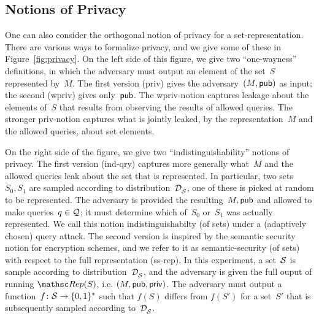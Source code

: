\subsection{Notions of Privacy}
One can also consider the orthogonal notion of privacy for a
set-representation.   There are various ways to formalize privacy, and
we give some of these in Figure~\ref{fig:privacy}.  
On the left side of this figure, we give two ``one-wayness''
definitions, in which the adversary must output an element of the
set~$S$ represented by~$M$.  The first version (priv) gives the
adversary~$(M,{\sf pub})$ as input; the second (wpriv) gives
only~${\sf pub}$.  The wpriv-notion captures leakage about the elements
of~$S$ that results from observing the results of allowed queries.
The stronger priv-notion captures what is jointly leaked, by the
representation~$M$ and the allowed queries, about set elements.

On the right side of the figure, we give two ``indistinguishability''
notions of privacy.  The first version (ind-qry) captures more
generally what~$M$ and the allowed queries leak about the set that is
represented.  In particular, two sets~$S_0,S_1$ are sampled according
to distribution~$\mathcal{D}_{{\cal S}}^{}$, one of these is picked at random to
be represented.  The adversary is provided the resulting~$M,{\sf pub}$
and allowed to make queries~$q \in {\cal Q}$; it must determine which
of~$S_0$ or~$S_1$ was actually represented.  We call this notion
indistinguishabilty (of sets) under a (adaptively chosen) query
attack.
%
The second version is inspired by the semantic security notion for
encryption schemes, and we refer to it as semantic-security (of sets)
with respect to the full representation (ss-rep).  In this experiment,
a set~${\cal S}$ is sample according to distribution~$\mathcal{D}_{{\cal S}}^{}$,
and the adversary is given the full ouput of running $\Rep(S)$,
i.e. $(M,{\sf pub},{\sf priv})$.  The adversary must output a
function~$f\colon{\cal S} \to \{0,1\}^*$ such that $f(S)$ differs from
$f(S')$ for a set~$S'$ that is subsequently sampled according to~$\mathcal{D}_{{\cal S}}^{}$.


